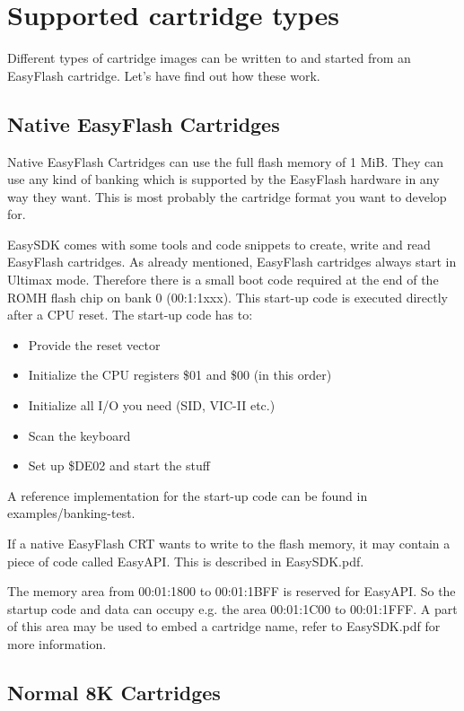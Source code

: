 \documentclass[a4paper,oneside]{memoir}
\begin{document}
\chapter{Supported cartridge types}

Different types of cartridge images can be written to and started from an
EasyFlash cartridge. Let's have find out how these work.

\section{Native EasyFlash Cartridges}\label{native-easyflash-cartridges}

Native EasyFlash Cartridges can use the full flash memory of 1 MiB. They can
use any kind of banking which is supported by the EasyFlash hardware in any way
they want. This is most probably the cartridge format you want to develop for.

EasySDK comes with some tools and code snippets to create, write and read
EasyFlash cartridges.
As already mentioned, EasyFlash cartridges always start in Ultimax mode.
Therefore there is a small boot code required at the end of the ROMH flash chip
on bank 0 (00:1:1xxx). This start-up code is executed directly after a CPU
reset.
The start-up code has to:

\begin{itemize}
  \item Provide the reset vector
  \item Initialize the CPU registers \$01 and \$00 (in this order)
  \item Initialize all I/O you need (SID, VIC-II etc.)
  \item Scan the keyboard
  \item Set up \$DE02 and start the stuff
\end{itemize}

A reference implementation for the start-up code can be found in
examples/banking-test.

If a native EasyFlash CRT wants to write to the flash memory, it may contain a
piece of code called EasyAPI. This is described in EasySDK.pdf.

The memory area from 00:01:1800 to 00:01:1BFF is reserved for EasyAPI. So the
startup code and data can occupy e.g. the area 00:01:1C00 to 00:01:1FFF. A part
of this area may be used to embed a cartridge name, refer to EasySDK.pdf for more information.

\section {Normal 8K Cartridges}
\end{document}
